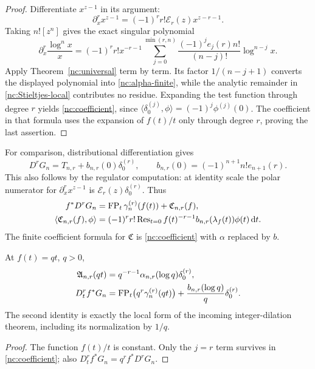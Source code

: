 \begin{proof}
Differentiate $x^{z-1}$ in its argument:
\[
 \partial_x^rx^{z-1}
    =(-1)^rr!\mathcal E_r(z)x^{z-r-1}.
\]
Taking $n![z^n]$ gives the exact singular polynomial
\begin{equation}\label{nc:singular-polynomial}
 \partial_x^r\frac{\log^n x}{x}
  =(-1)^rr!x^{-r-1}
      \sum_{j=0}^{\min(r,n)}
       \frac{(-1)^je_j(r)n!}{(n-j)!}\log^{n-j}x.
\end{equation}
Apply Theorem~\ref{nc:universal} term by term. Its factor
$1/(n-j+1)$ converts the displayed polynomial into
\eqref{nc:alpha-finite}, while the analytic remainder in
\eqref{nc:Stieltjes-local} contributes no residue. Expanding the test
function through degree $r$ yields \eqref{nc:coefficient}, since
$\langle\delta_0^{(j)},\phi\rangle=(-1)^j\phi^{(j)}(0)$.
The coefficient in that formula uses the expansion of $f(t)/t$ only
through degree $r$, proving the last assertion.
\end{proof}

For comparison, distributional differentiation gives
\begin{equation}\label{nc:derivative-contact}
 D^rG_n=T_{n,r}+b_{n,r}(0)\delta_0^{(r)},\qquad
 b_{n,r}(0)=(-1)^{n+1}n!e_{n+1}(r).
\end{equation}
This also follows by the regulator computation: at identity scale the
polar numerator for $\partial_x^rx^{z-1}$ is
$\mathcal E_r(z)\delta_0^{(r)}$. Thus
\begin{align}
 f^*D^rG_n&=\operatorname{FP}_t\gamma_n^{(r)}(f(t))+\mathfrak C_{n,r}(f),
       \label{nc:distributional-law}\\
 \langle\mathfrak C_{n,r}(f),\phi\rangle
   &=(-1)^rr!\operatorname{Res}_{t=0}
       f(t)^{-r-1}b_{n,r}(\lambda_f(t))\phi(t)\,\mathrm d t.
       \label{nc:Cresidue}
\end{align}
The finite coefficient formula for $\mathfrak C$ is
\eqref{nc:coefficient} with $\alpha$ replaced by $b$.

\begin{corollary}
\label{nc:affine}
At $f(t)=qt$, $q>0$,
\begin{align}
 \mathfrak A_{n,r}(qt)&=q^{-r-1}\alpha_{n,r}(\log q)
                         \delta_0^{(r)},\label{nc:affine-A}\\
 D_t^r f^*G_n
   &=\operatorname{FP}_t\bigl(q^r\gamma_n^{(r)}(qt)\bigr)
        +\frac{b_{n,r}(\log q)}q\delta_0^{(r)}.
       \label{nc:affine-C}
\end{align}
The second identity is exactly the local form of the incoming
integer-dilation theorem, including its normalization by $1/q$.
\end{corollary}
\begin{proof}
The function $f(t)/t$ is constant. Only the $j=r$ term survives in
\eqref{nc:coefficient}; also
$D_t^rf^*G_n=q^rf^*D^rG_n$.
\end{proof}

